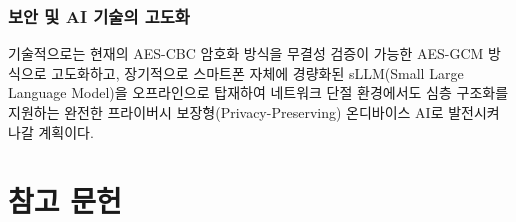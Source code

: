 \documentclass[11pt,a4paper]{article}
\begin{document}
\subsubsection{보안 및 AI 기술의 고도화}
기술적으로는 현재의 AES-CBC 암호화 방식을 무결성 검증이 가능한 AES-GCM 방식으로 고도화하고, 장기적으로 스마트폰 자체에 경량화된 sLLM(Small Large Language Model)을 오프라인으로 탑재하여 네트워크 단절 환경에서도 심층 구조화를 지원하는 완전한 프라이버시 보장형(Privacy-Preserving) 온디바이스 AI로 발전시켜 나갈 계획이다.

\newpage

\section{참고 문헌}
\end{document}
